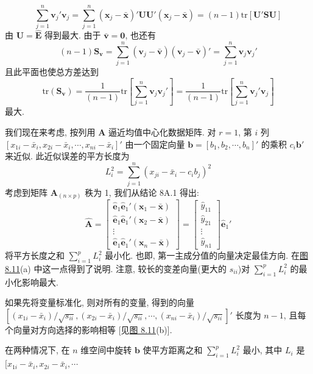 
\[
\sum_{j=1}^{n}\mathbf{v}_j'\mathbf{v}_j=\sum_{j=1}^{n}(\mathbf{x}_j-\bar{\mathbf{x}})'\mathbf{U}\mathbf{U}'(\mathbf{x}_j-\bar{\mathbf{x}})=(n-1)\mathrm{tr}[\mathbf{U}'\mathbf{S}\mathbf{U}]
\]
由 $\mathbf{U}=\hat{\mathbf{E}}$ 得到最大. 由于 $\bar{\mathbf{v}}=\mathbf{0}$, 也还有
\[
(n-1)\mathbf{S}_{\mathbf{v}}=\sum_{j=1}^{n}(\mathbf{v}_j-\bar{\mathbf{v}})(\mathbf{v}_j-\bar{\mathbf{v}})'=\sum_{j=1}^{n}\mathbf{v}_j\mathbf{v}_j'
\]
且此平面也使总方差达到
\[
\mathrm{tr}(\mathbf{S}_{\mathbf{v}})=\frac{1}{(n-1)}\mathrm{tr}\left[\sum_{j=1}^{n}\mathbf{v}_j\mathbf{v}_j'\right]=\frac{1}{(n-1)}\mathrm{tr}\left[\sum_{j=1}^{n}\mathbf{v}_j'\mathbf{v}_j\right]
\]
最大.


我们现在来考虑, 按列用 $\mathbf{A}$ 逼近均值中心化数据矩阵. 对 $r=1$, 第 $i$ 列 $[x_{1i}-\bar{x}_i,x_{2i}-\bar{x}_i,\cdots,x_{ni}-\bar{x}_i]'$ 由一个固定向量 $\mathbf{b}=[b_1,b_2,\cdots,b_n]'$ 的乘积 $c_i\mathbf{b}'$ 来近似. 此近似误差的平方长度为
\[
L_i^2=\sum_{j=1}^{n}(x_{ji}-\bar{x}_i-c_ib_j)^2
\]
考虑到矩阵 $\mathbf{A}_{(n\times p)}$ 秩为 1, 我们从结论 8A.1 得出:
\[
\hat{\mathbf{A}}=\begin{bmatrix}\hat{\mathbf{e}}_1\hat{\mathbf{e}}_1'(\mathbf{x}_1-\bar{\mathbf{x}})\\ \hat{\mathbf{e}}_1\hat{\mathbf{e}}_1'(\mathbf{x}_2-\bar{\mathbf{x}})\\ \vdots\\ \hat{\mathbf{e}}_1\hat{\mathbf{e}}_1'(\mathbf{x}_n-\bar{\mathbf{x}})\end{bmatrix}=\begin{bmatrix}\hat{y}_{11}\\ \hat{y}_{21}\\ \vdots\\ \hat{y}_{n1}\end{bmatrix}\hat{\mathbf{e}}_1'
\]
将平方长度之和 $\sum_{i=1}^{p}L_i^2$ 最小化. 也即, 第一主成分值的向量决定最佳方向. 在\hyperref[fig:8.11]{图 8.11}(a) 中这一点得到了说明. 注意, 较长的变差向量(更大的 $s_{ii}$)对 $\sum_{i=1}^{p}L_i^2$ 的最小化影响最大.

如果先将变量标准化, 则对所有的变量, 得到的向量 $\left[(x_{1i}-\bar{x}_i)/\sqrt{s_{ii}},(x_{2i}-\bar{x}_i)/\sqrt{s_{ii}},\cdots,(x_{ni}-\bar{x}_i)/\sqrt{s_{ii}}\right]'$ 长度为 $n-1$, 且每个向量对方向选择的影响相等 [见\hyperref[fig:8.11]{图 8.11}(b)].

在两种情况下, 在 $n$ 维空间中旋转 $\mathbf{b}$ 使平方距离之和 $\sum_{i=1}^{p}L_i^2$ 最小, 其中 $L_i$ 是 $[x_{1i}-\bar{x}_i,x_{2i}-\bar{x}_i,\cdots$

\begin{mvfigure}
\label{fig:8.11}
\end{mvfigure}

